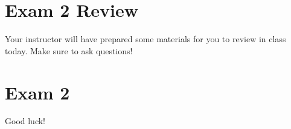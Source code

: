 
\chapter{Exam 2 Review}

Your instructor will have prepared some materials for you to review in class today.  Make sure to ask questions!

{\let\clearpage\relax\chapter{Exam 2}}

Good luck!